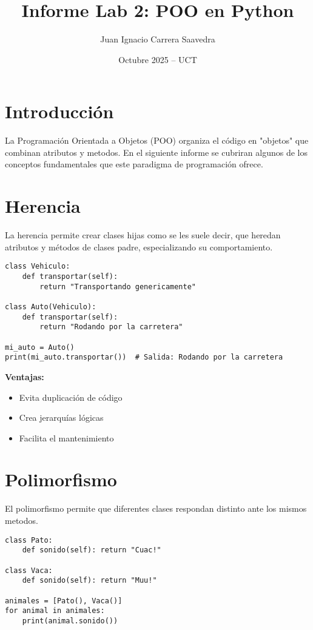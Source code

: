 \documentclass[a4paper,12pt]{article}
\title{\textbf{Informe Lab 2: POO en Python}}
\author{Juan Ignacio Carrera Saavedra}
\date{Octubre 2025 -- UCT}
\begin{document}
\maketitle
\tableofcontents
\newpage

\section{Introducción}

La Programación Orientada a Objetos (POO) organiza el código en "objetos" que combinan atributos y metodos. En el siguiente informe se cubriran algunos de los conceptos fundamentales que este paradigma de programación ofrece.

\section{Herencia}

La herencia permite crear clases hijas como se les suele decir, que heredan atributos y métodos de clases padre, especializando su comportamiento.

\begin{lstlisting}[caption={Herencia básica en Python}]
class Vehiculo:
    def transportar(self):
        return "Transportando genericamente"

class Auto(Vehiculo):
    def transportar(self):
        return "Rodando por la carretera"

mi_auto = Auto()
print(mi_auto.transportar())  # Salida: Rodando por la carretera
\end{lstlisting}

\textbf{Ventajas:}
\begin{itemize}
  \item Evita duplicación de código
  \item Crea jerarquías lógicas
  \item Facilita el mantenimiento
\end{itemize}

\section{Polimorfismo}

El polimorfismo permite que diferentes clases respondan distinto ante los mismos metodos.

\begin{lstlisting}[caption={Polimorfismo en acción}]
class Pato:
    def sonido(self): return "Cuac!"

class Vaca:
    def sonido(self): return "Muu!"

animales = [Pato(), Vaca()]
for animal in animales:
    print(animal.sonido())
\end{lstlisting}
\end{document}
